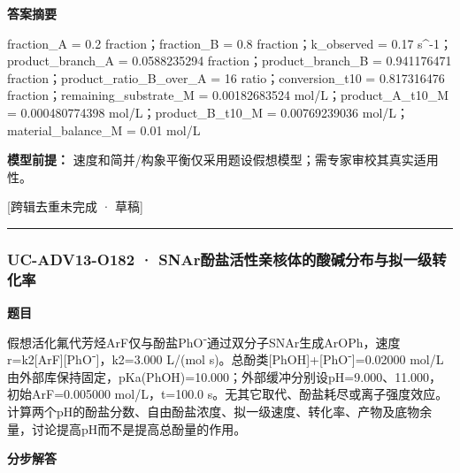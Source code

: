 \documentclass[UTF8,11pt,a4paper]{ctexart}
\begin{document}
\noindent\textbf{答案摘要}\par
fraction\_A = 0.2 fraction；fraction\_B = 0.8 fraction；k\_observed = 0.17 s\textasciicircum{}-1；product\_branch\_A = 0.0588235294 fraction；product\_branch\_B = 0.941176471 fraction；product\_ratio\_B\_over\_A = 16 ratio；conversion\_t10 = 0.817316476 fraction；remaining\_substrate\_M = 0.00182683524 mol/L；product\_A\_t10\_M = 0.000480774398 mol/L；product\_B\_t10\_M = 0.00769239036 mol/L；material\_balance\_M = 0.01 mol/L\par
\noindent\textbf{模型前提：}
速度和简并/构象平衡仅采用题设假想模型；需专家审校其真实适用性。\par
\noindent\textcolor{red!65!black}{[跨辑去重未完成 · 草稿]} \par
\medskip\hrule\medskip
{}
\subsubsection*{UC-ADV13-O182 · SNAr酚盐活性亲核体的酸碱分布与拟一级转化率}
\noindent\textbf{题目}\par
假想活化氟代芳烃ArF仅与酚盐PhO⁻通过双分子SNAr生成ArOPh，速度r=k2[ArF][PhO⁻]，k2=3.000 L/(mol s)。总酚类[PhOH]+[PhO⁻]=0.02000 mol/L由外部库保持固定，pKa(PhOH)=10.000；外部缓冲分别设pH=9.000、11.000，初始ArF=0.005000 mol/L，t=100.0 s。无其它取代、酚盐耗尽或离子强度效应。计算两个pH的酚盐分数、自由酚盐浓度、拟一级速度、转化率、产物及底物余量，讨论提高pH而不是提高总酚量的作用。\par
\medskip\noindent\textbf{分步解答}
\end{document}

